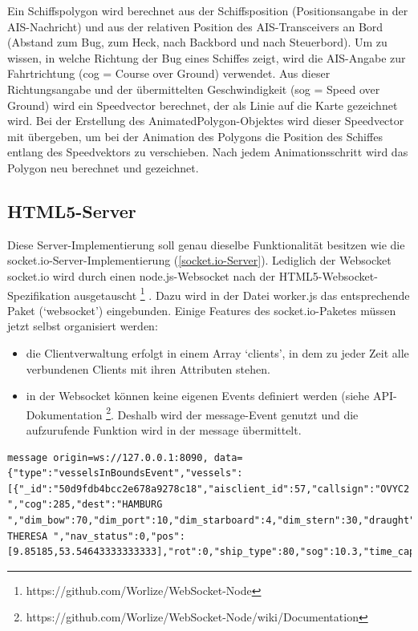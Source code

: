 Ein Schiffspolygon wird berechnet aus der Schiffsposition (Positionsangabe in der AIS-Nachricht) und aus der relativen Position des AIS-Transceivers an Bord (Abstand zum Bug, zum Heck, nach Backbord und nach Steuerbord). Um zu wissen, in welche Richtung der Bug eines Schiffes zeigt, wird die AIS-Angabe zur Fahrtrichtung (cog = Course over Ground) verwendet. Aus dieser Richtungsangabe und der übermittelten Geschwindigkeit (sog = Speed over Ground) wird ein Speedvector berechnet, der als Linie auf die Karte gezeichnet wird. Bei der Erstellung des AnimatedPolygon-Objektes wird dieser Speedvector mit übergeben, um bei der Animation des Polygons die Position des Schiffes entlang des Speedvektors zu verschieben. Nach jedem Animationsschritt wird das Polygon neu berechnet und gezeichnet.


\subsection{HTML5-Server}\label{HTML5-Server}
Diese Server-Implementierung soll genau dieselbe Funktionalität besitzen wie die socket.io-Server-Implementierung (\ref{socket.io-Server}). Lediglich der Websocket socket.io wird durch einen node.js-Websocket nach der HTML5-Websocket-Spezifikation ausgetauscht \footnote{\label{foot:2}https://github.com/Worlize/WebSocket-Node} . Dazu wird in der Datei worker.js das entsprechende Paket (‘websocket’) eingebunden.
Einige Features des socket.io-Paketes müssen jetzt selbst organisiert werden: 
\begin{itemize}
\item die Clientverwaltung erfolgt in einem Array ‘clients’, in dem zu jeder Zeit alle verbundenen Clients mit ihren Attributen stehen. 
\item in der Websocket können keine eigenen Events definiert werden (siehe API-Dokumentation \footnote{\label{foot:2}https://github.com/Worlize/WebSocket-Node/wiki/Documentation}. Deshalb wird der message-Event genutzt und die aufzurufende Funktion wird in der message übermittelt.
\end{itemize}
\begin{lstlisting}[caption= vom Websocket-Server gesendete message, label=websocket-message]
message origin=ws://127.0.0.1:8090, data={"type":"vesselsInBoundsEvent","vessels":[{"_id":"50d9fdb4bcc2e678a9278c18","aisclient_id":57,"callsign":"OVYC2 ","cog":285,"dest":"HAMBURG ","dim_bow":70,"dim_port":10,"dim_starboard":4,"dim_stern":30,"draught":54,"imo":"9363170","mmsi":220515000,"msgid":1,"name":"RIKKE THERESA ","nav_status":0,"pos":[9.85185,53.54643333333333],"rot":0,"ship_type":80,"sog":10.3,"time_captured":1366733896000,"time_received":1366733855248,"true_heading":286}]}

\end{lstlisting}
